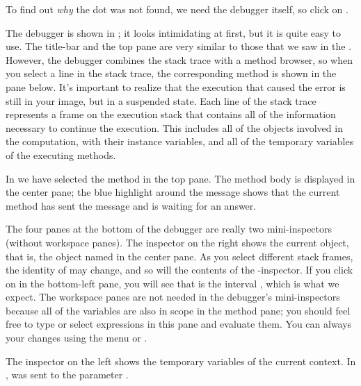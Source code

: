 \documentclass[a4paper,10pt,twoside]{book}
\begin{document}
To find out \emph{why} the dot was not found, we need the debugger itself, so click on .


The debugger is shown in ; it looks intimidating at first, but it is quite easy to use.
The title-bar and the top pane are very similar to those that we saw in the .  
However, the debugger combines the stack trace with a method browser, so when you select a line in the stack trace, the corresponding method is shown in the pane below.
It's important to realize that the execution that caused the error is still in your image, but in a suspended state.  
Each line of the stack trace represents a frame on the execution stack that contains all of the information necessary to continue the execution.  This includes all of the objects involved in the computation, with their instance variables, and all of the temporary variables of the executing methods.

In  we have selected the  method in the top pane.
The method body is displayed in the center pane; the blue highlight around the message  shows that the current method has sent the message  and is waiting for an answer.

The four panes at the bottom of the debugger are really two mini-inspectors (without workspace panes).
The inspector on the right shows the current object, that is, the object named \self in the center pane.
As you select different stack frames, the identity of \self may change, and so will the contents of the 
\self{}-inspector.
If you click on \self in the bottom-left pane, you will see that \self is the interval , which is what we expect.
The workspace panes are not needed in the debugger's mini-inspectors because all of the variables are also in scope in the method pane; you should feel free to type or select expressions in this pane and evaluate them.  
You can always  your changes using the menu or . 

The inspector on the left shows the temporary variables of the current context.
In ,
 was sent to the parameter .
\end{document}
